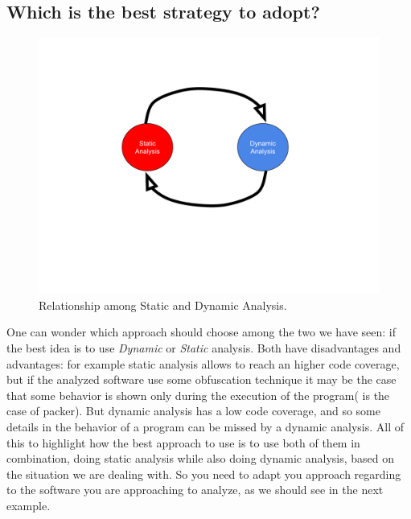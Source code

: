 \documentclass{article}
\begin{document}
\subsection{Which is the best strategy to adopt?}
\begin{figure}[htp]
    \centering
    \includegraphics[width=1\textwidth]{images/staticAndDynamic.pdf}
    \caption{Relationship among Static and Dynamic Analysis.}
    \label{fig:gdb}
\end{figure}
One can wonder which approach should choose among the two we have seen: if the best idea is to use \textit{Dynamic} or \textit{Static} analysis. Both have disadvantages and advantages: for example static analysis allows to reach an higher code coverage, but if the analyzed software use some obfuscation technique it may be the case that some behavior is shown only during the execution of the program( is the case of packer\citep{packer}).
But dynamic analysis has a low code coverage, and so some details in the behavior of a program can be missed by a dynamic analysis.
All of this to highlight how the best approach to use is to use both of them in combination, doing static analysis while also doing dynamic analysis, based on the situation we are dealing with. 
So you need to adapt you approach regarding to the software you are approaching to analyze, as we should see in the next example.

\clearpage
\end{document}
